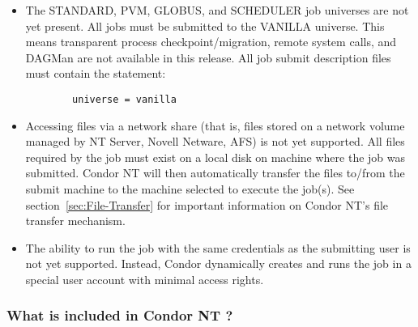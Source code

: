 \begin{itemize}

\item The STANDARD, PVM, GLOBUS, and SCHEDULER job universes are not yet
present.  
All jobs must be submitted to the VANILLA universe.  This means
transparent process checkpoint/migration, remote system calls, and DAGMan
are not available in this release.
All job submit description files must contain the statement:
\begin{verbatim}
        universe = vanilla
\end{verbatim}

\item Accessing files via a network share (that is,
files stored on a network volume managed by NT Server, Novell Netware, AFS)
is not yet supported.
All files required by the job must exist on a local disk on
machine where the job was submitted.  Condor NT will then automatically
transfer the files to/from the submit machine to the machine selected to
execute the job(s).  See section~\ref{sec:File-Transfer} for important
information on Condor NT's file transfer mechanism.

\item The ability to run the job with the same credentials as the submitting
user is not yet supported.  Instead, Condor dynamically creates and runs the
job in a special user account with minimal access rights.

\end{itemize}

\subsubsection{What is included in Condor NT \VersionNotice?}

